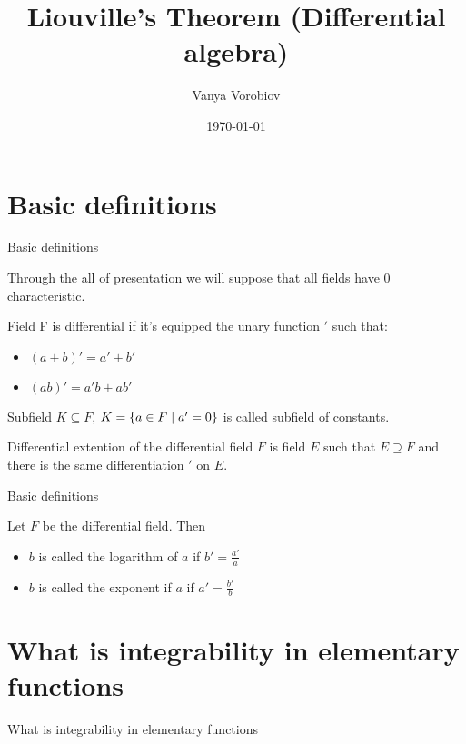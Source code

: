 \documentclass[10pt]{beamer}
\renewcommand{\|}{\ensuremath{\hspace{0.1cm} | \hspace{0.1cm}}}
\begin{document}
    \title[Liouville's Theorem]{Liouville's Theorem (Differential algebra)}
    \author{Vanya Vorobiov}
    \date{\today}

    \begin{frame}
        \titlepage
    \end{frame}

    \section{Basic definitions}
    \begin{frame}{Basic definitions}
        \begin{remark}
            Through the all of presentation we will suppose that all fields have 0 characteristic.
        \end{remark}
        \begin{definition}
            Field F is differential if it's equipped the unary function $'$ such that:
            \begin{itemize}
                \item $(a+b)' = a' + b'$
                \item $(ab)' = a'b + ab'$
            \end{itemize}
        \end{definition}
        \begin{definition}
            Subfield $K\subseteq F$, $K = \{ a \in F \| a' = 0 \}$ is called subfield of constants.
        \end{definition}
        \begin{definition}
            Differential extention of the differential field $F$ is field $E$ such that $E\supseteq F$ and there is the same differentiation $'$ on $E$.
        \end{definition}
    \end{frame}

\begin{frame}{Basic definitions}
    \begin{definition}
        Let $F$ be the differential field. Then
        \begin{itemize}
            \item $b$ is called the logarithm of $a$ if $b' = \frac{a'}{a}$
            \item $b$ is called the exponent if $a$ if $a' = \frac{b'}{b}$
        \end{itemize}
    \end{definition}
\end{frame}

\section{What is integrability in elementary functions}
\begin{frame}{What is integrability in elementary functions}

\end{frame}
\end{document}
